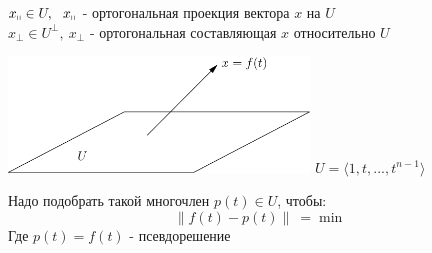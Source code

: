 $x_{\shortparallel} \in U, \ \ x_{\shortparallel}$ - ортогональная проекция вектора $x$ на $U$\\
$x_{\perp} \in U^{\perp}, \ x_{\perp}$ - ортогональная составляющая $x$ относительно $U$
\begin{example1}\tab
    \begin{center}
        \includegraphics[width=8cm]{image/Asymptote/4/linal-4-1.pdf}
        $U = \langle 1,t,...,t^{n-1} \rangle$ 
    \end{center}
    Надо подобрать такой многочлен $p(t) \in U$, чтобы: 
    $$\parallel f(t) - p(t)\parallel \ = \min$$
    Где $p(t) = f(t)$ - псевдорешение  
\end{example1}
